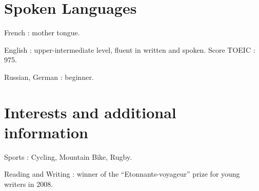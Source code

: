 \documentclass{article}
\renewenvironment{itemize}{
  \begin{list}{}{
      \setlength{\leftmargin}{1.5em}
      \setlength{\itemsep}{0.25em}
      \setlength{\parskip}{0pt}
      \setlength{\parsep}{0.25em}
    }
}{
  \end{list}
}
\begin{document}
\section*{Spoken Languages}
\begin{itemize}
	\item French : mother tongue.
	\item English : upper-intermediate level, fluent in written and spoken. Score TOEIC : 975.
	\item Russian, German : beginner.
\end{itemize}
\section*{Interests and additional information}
\begin{itemize}
	\item Sports : Cycling, Mountain Bike, Rugby.
	\item Reading and Writing : winner of the ``Etonnants-voyageur'' prize for young writers in 2008.
\end{itemize}  
\end{document}
